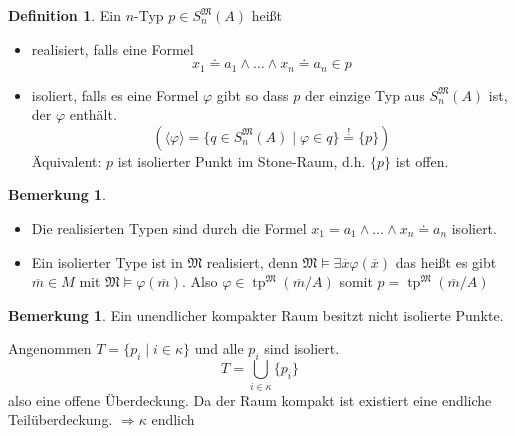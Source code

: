 \documentclass[12pt,parskip=full]{scrartcl}
\theoremstyle{definition}
\newtheorem{definition}[theorem]{Definition}
\newtheorem{remark}[theorem]{Bemerkung}
\begin{document}
 	\begin{definition}
 		Ein $n$-Typ $p \in S_n^\mathfrak{M}(A)$ heißt
 		\begin{itemize}
 			\item realisiert, falls eine Formel
 			\begin{equation*}
	 			x_1 \doteq a_1 \land \dots \land x_n \doteq a_n \in p
 			\end{equation*}
 			\item isoliert, falls es eine Formel $\varphi$ gibt so dass $p$ der einzige Typ aus $S_n^\mathfrak{M}(A)$ ist, der $\varphi$ enthält.
 			\begin{equation*}
	 			\left( \langle \varphi \rangle = \{ q \in S_n^\mathfrak{M}(A) \mid \varphi \in q \} \overset{!}{=} \{ p \} \right)
 			\end{equation*}
 			Äquivalent: $p$ ist isolierter Punkt im Stone-Raum, d.h. $\{ p \}$ ist offen.
 		\end{itemize}
 	\end{definition}
 
 	\begin{remark}
 		\begin{itemize}
 			\item Die realisierten Typen sind durch die Formel $x_1 = a_1 \land \dots \land x_n \doteq a_n$ isoliert.
 			\item Ein isolierter Type ist in $\mathfrak{M}$ realisiert, denn $\mathfrak{M} \models \exists \overline{x} \varphi(\overline{x})$ das heißt es gibt $\overline{m} \in M$ mit $\mathfrak{M} \models \varphi(\overline{m})$. Also $\varphi \in \operatorname{tp}^\mathfrak{M}(\overline{m} / A)$ somit $p = \operatorname{tp}^\mathfrak{M}(\overline{m} / A)$
 		\end{itemize}
 	\end{remark}
 
 	\begin{remark}
 		Ein unendlicher kompakter Raum besitzt nicht isolierte Punkte.
 		
 		Angenommen $T = \{ p_i \mid i \in \kappa \}$ und alle $p_i$ sind isoliert.
 		\begin{equation*}
	 		T = \bigcup_{i \in \kappa} \{ p_i \}
 		\end{equation*}
 		also eine offene Überdeckung. Da der Raum kompakt ist existiert eine endliche Teilüberdeckung. $\Rightarrow \kappa$ endlich
 	\end{remark}
	
\end{document}
